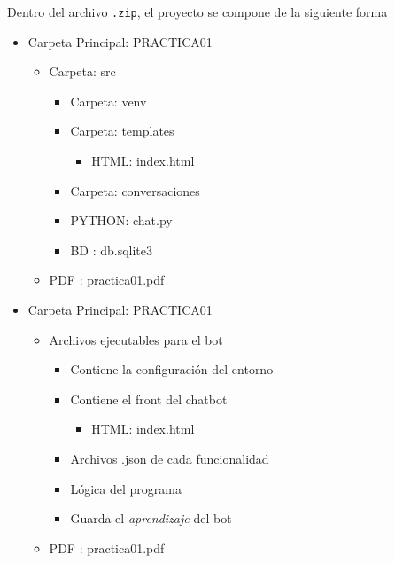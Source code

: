 \documentclass[a4paper,12pt]{article}
\begin{document}
Dentro del archivo \texttt{.zip}, el proyecto se compone de la siguiente forma\\

\begin{minipage}[t]{6.8cm}
\begin{itemize}
    \item Carpeta Principal: PRACTICA01
    \begin{itemize}        
        \item Carpeta: src
        \begin{itemize}
            \item Carpeta: venv
            \item Carpeta: templates                        
            \begin{itemize}
                \item HTML: index.html
            \end{itemize}
            \item Carpeta: conversaciones
            \item PYTHON: chat.py            
            \item BD : db.sqlite3
        \end{itemize}
        \item PDF : practica01.pdf
    \end{itemize}
\end{itemize}
\end{minipage}
\hspace{2mm}
\begin{minipage}[t]{9cm}
    \begin{itemize}
        \item[] Carpeta Principal: PRACTICA01
        \begin{itemize}
            \item[] Archivos ejecutables para el bot
            \begin{itemize}
                \item[] Contiene la configuración del entorno
                \item[] Contiene el front del chatbot            
                \begin{itemize}
                    \item[] HTML: index.html
                \end{itemize}
                \item[] Archivos .json de cada funcionalidad
                \item[] Lógica del programa                
                \item[] Guarda el \textit{aprendizaje} del bot 
            \end{itemize}
            \item[] PDF : practica01.pdf
        \end{itemize}
    \end{itemize}
\end{minipage}
\end{document}
